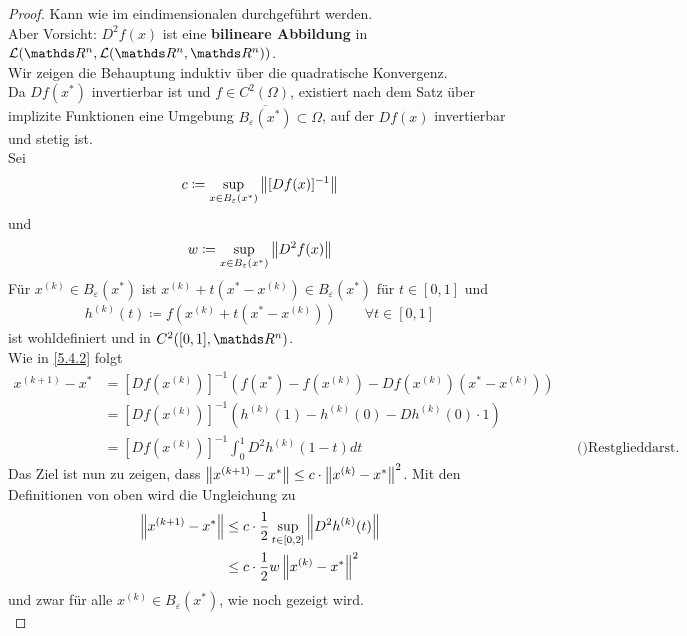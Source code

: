 \begin{proof}
  Kann wie im eindimensionalen durchgeführt werden.\\
  Aber Vorsicht: $D^2f(x)$ ist eine \textbf{bilineare Abbildung} in 
  $\mathcal{L}(\Ren, \mathcal{L}(\Ren, \Ren))$. \\
  
  Wir zeigen die Behauptung induktiv über die quadratische Konvergenz.\\
  Da $Df(x^{*})$ invertierbar ist und $f\in C^2(\Omega) $,
  existiert nach dem Satz über implizite Funktionen
  eine Umgebung $\overline{B_\varepsilon(x^{*})}\subset \Omega$,
  auf der $Df(x)$ invertierbar und stetig ist.\\
  Sei 
  \begin{gather*}
    c\coloneqq \sup_{x\in B_\varepsilon(x^{*})} \left\| [Df(x)]^{-1} \right\|
  \end{gather*}
  und 
  \begin{gather*}
    w\coloneqq \sup_{x\in B_\varepsilon(x^{*})}\left\| D^2f(x) \right\|
  \end{gather*}
  Für $x^{(k)}\in B_\varepsilon(x^{*}) $ ist $x^{(k)}+t(x^{*}-x^{(k)})\in B_\varepsilon(x^{*})$
  für $t\in [0,1]$ und 
  \begin{gather*}
    h^{(k)}(t) \coloneqq f(x^{(k)}+ t(x^{*}-x^{(k)}))\qquad \forall t\in [0,1]
  \end{gather*}
  ist wohldefiniert und in $C^2([0,1], \Ren)$.\\
  Wie in \ref{5.4.2} folgt 
  \begin{align*}
    x^{(k+1)}-x^{*} &= [Df(x^{(k)})]^{-1}\left(f(x^{*})-f(x^{(k)})-Df(x^{(k)})(x^{*}-x^{(k)})\right)\\
                    &= [Df(x^{(k)})]^{-1}\left( h^{(k)}(1)-h^{(k)}(0)-Dh^{(k)}(0)\cdot 1\right)\\
                    &= [Df(x^{(k)})]^{-1} \int_{0}^{1}D^2h^{(k)}(1-t)dt &&\text{()Restglieddarst. der Taylorentw.)}
  \end{align*}
  Das Ziel ist nun zu zeigen, dass $\left\| x^{(k+1)}-x^{*} \right\| \leq c\cdot \left\| x^{(k)}-x^{*} \right\|^2$.
  Mit den Definitionen von oben wird die Ungleichung zu
  \begin{align}\nonumber
    \left\| x^{(k+1)}-x^{*} \right\| &\leq c\cdot \frac{1}{2} \sup_{t\in[0,2]} \left\| D^2h^{(k)}(t) \right\| \\
                         & \leq c\cdot \frac{1}{2} w\left\| x^{(k)}-x^{*} \right\|^2
                           \label{V.5.5}
  \end{align}
  und zwar für alle $x^{(k)}\in B_\varepsilon(x^{*})$, wie noch gezeigt wird.\\

\end{proof}

